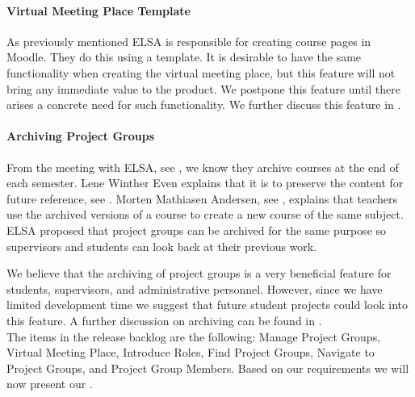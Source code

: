 \paragraph{Virtual Meeting Place Template}
As previously mentioned ELSA is responsible for creating course pages in Moodle. 
They do this using a template. 
It is desirable to have the same functionality when creating the virtual meeting place, but this feature will not bring any immediate value to the product. 
We postpone this feature until there arises a concrete need for such functionality.
We further discuss this feature in \secref{}.

\paragraph{Archiving Project Groups}
\label{sub:analysarchiving}
From the meeting with ELSA, see , we know they archive courses at the end of each semester. 
Lene Winther Even explains that it is to preserve the content for future reference, see . 
Morten Mathiasen Andersen, see , explains that teachers use the archived versions of a course to create a new course of the same subject. 
ELSA proposed that project groups can be archived for the same purpose so supervisors and students can look back at their previous work.

We believe that the archiving of project groups is a very beneficial feature for students, supervisors, and administrative personnel.
However, since we have limited development time we suggest that future student projects could look into this feature.
A further discussion on archiving can be found in .\\

The items in the release backlog are the following: Manage Project Groups, Virtual Meeting Place, Introduce Roles, Find Project Groups, Navigate to Project Groups, and Project Group Members. 
Based on our requirements we will now present our .

